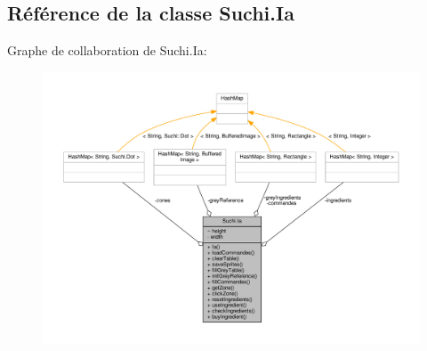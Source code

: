 \hypertarget{classSuchi_1_1Ia}{}\subsection{Référence de la classe Suchi.\+Ia}
\label{classSuchi_1_1Ia}


Graphe de collaboration de Suchi.\+Ia\+:\nopagebreak
\begin{figure}[H]
\begin{center}
\leavevmode
\includegraphics[width=350pt]{classSuchi_1_1Ia__coll__graph}
\end{center}
\end{figure}
